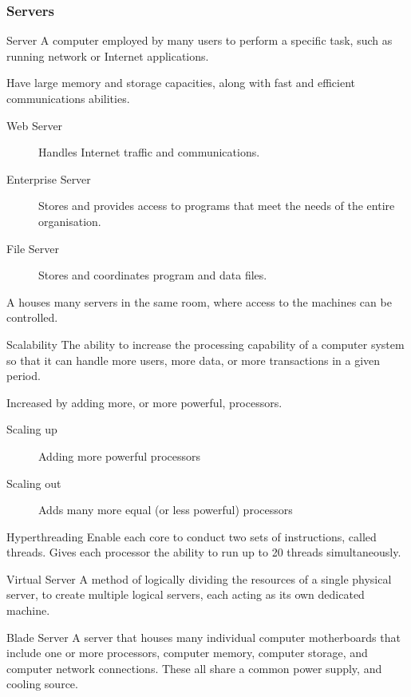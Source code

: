 \documentclass[\main/notes.tex]{subfiles}
\begin{document}
				\subsubsection{Servers}
					\begin{definition}{Server}
						A computer employed by many users to perform a specific task, such as running network or Internet applications.

						Have large memory and storage capacities, along with fast and efficient communications abilities.
						\begin{description}
							\item[Web Server] Handles Internet traffic and communications.
							\item[Enterprise Server] Stores and provides access to programs that meet the needs of the entire organisation.
							\item[File Server] Stores and coordinates program and data files.
						\end{description}

						A  houses many servers in the same room, where access to the machines can be controlled.
					\end{definition}
					\begin{definition}{Scalability}
						The ability to increase the processing capability of a computer system so that it can handle more users, more data, or more transactions in a given period.

						Increased by adding more, or more powerful, processors.
						\begin{description}
							\item[Scaling up] Adding more powerful processors
							\item[Scaling out] Adds many more equal (or less powerful) processors 
						\end{description}
					\end{definition}
					\begin{sidenote}{Hyperthreading}
						Enable each core to conduct two sets of instructions, called threads. Gives each processor the ability to run up to 20 threads simultaneously.
					\end{sidenote}
					\begin{definition}{Virtual Server}
						A method of logically dividing the resources of a single physical server, to create multiple logical servers, each acting as its own dedicated machine.
					\end{definition}
					\begin{definition}{Blade Server}
						A server that houses many individual computer motherboards that include one or more processors, computer memory, computer storage, and computer network connections. These all share a common power supply, and cooling source.
					\end{definition}
\end{document}
